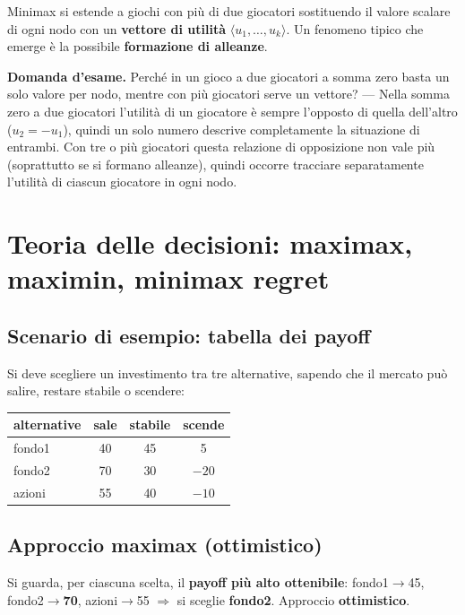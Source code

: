 \documentclass[11pt,a4paper]{report}
\newcommand{\domandaesame}[1]{\begin{esame}\textbf{Domanda d'esame.} #1\end{esame}}
\begin{document}
Minimax si estende a giochi con più di due giocatori sostituendo il valore scalare di ogni nodo con un \textbf{vettore di utilità} $\langle u_1,\dots,u_k \rangle$. Un fenomeno tipico che emerge è la possibile \textbf{formazione di alleanze}.

\domandaesame{Perché in un gioco a due giocatori a somma zero basta un solo valore per nodo, mentre con più giocatori serve un vettore? --- Nella somma zero a due giocatori l'utilità di un giocatore è sempre l'opposto di quella dell'altro ($u_2=-u_1$), quindi un solo numero descrive completamente la situazione di entrambi. Con tre o più giocatori questa relazione di opposizione non vale più (soprattutto se si formano alleanze), quindi occorre tracciare separatamente l'utilità di ciascun giocatore in ogni nodo.}

\section{Teoria delle decisioni: maximax, maximin, minimax regret}

\subsection*{Scenario di esempio: tabella dei payoff}

Si deve scegliere un investimento tra tre alternative, sapendo che il mercato può salire, restare stabile o scendere:

\begin{center}
\begin{tabular}{@{}lccc@{}}
\toprule
\textbf{alternative} & \textbf{sale} & \textbf{stabile} & \textbf{scende} \\
\midrule
fondo1 & 40 & 45 & 5 \\
fondo2 & 70 & 30 & $-20$ \\
azioni & 55 & 40 & $-10$ \\
\bottomrule
\end{tabular}
\end{center}

\subsection*{Approccio maximax (ottimistico)}

Si guarda, per ciascuna scelta, il \textbf{payoff più alto ottenibile}: fondo1$\to$45, fondo2$\to$\textbf{70}, azioni$\to$55 $\Rightarrow$ si sceglie \textbf{fondo2}. Approccio \textbf{ottimistico}.
\end{document}
